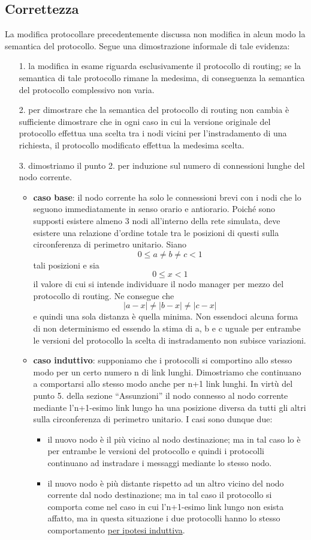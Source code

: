 \documentclass[	
	DIV=calc,
	paper=a4,
	fontsize=11pt,
	onecolumn
]{scrartcl} %
\begin{document}
	\subsection{Correttezza}
	La modifica protocollare precedentemente discussa non modifica in alcun modo la semantica del protocollo. Segue una dimostrazione informale di tale evidenza:
\begin{itemize}
	\item[1.] la modifica in esame riguarda esclusivamente il protocollo di routing; se la semantica di tale protocollo rimane la medesima, di conseguenza la semantica del protocollo complessivo non varia.
	\item[2.] per dimostrare che la semantica del protocollo di routing non cambia è sufficiente dimostrare che in ogni caso in cui la versione originale del protocollo effettua una scelta tra i nodi vicini per l'instradamento di una richiesta, il protocollo modificato effettua la medesima scelta.
	\item[3.] dimostriamo il punto 2. per induzione sul numero di connessioni lunghe del nodo corrente. 
	\begin{itemize}
	\item \textbf{caso base}: il nodo corrente ha solo le connessioni brevi con i nodi che lo seguono immediatamente in senso orario e antiorario. Poiché sono supposti esistere almeno 3 nodi all'interno della rete simulata, deve esistere una relazione d'ordine totale tra le posizioni di questi sulla circonferenza di perimetro unitario. Siano \[0 \leq a \neq b \neq c < 1\] tali posizioni e sia \[0 \leq x < 1\] il valore di cui si intende individuare il nodo manager per mezzo del protocollo di routing. Ne consegue che \[|a-x| \neq |b-x| \neq |c-x|\] e quindi una sola distanza è quella minima. Non essendoci alcuna forma di non determinismo ed essendo la stima di a, b e c uguale per entrambe le versioni del protocollo la scelta di instradamento non subisce variazioni.
	\item \textbf{caso induttivo}: supponiamo che i protocolli si comportino allo stesso modo per un certo numero n di link lunghi. Dimostriamo che continuano a comportarsi allo stesso modo anche per n+1 link lunghi. In virtù del punto 5. della sezione ``Assunzioni'' il nodo connesso al nodo corrente mediante l'n+1-esimo link lungo ha una posizione diversa da tutti gli altri sulla circonferenza di perimetro unitario. I casi sono dunque due:
		\begin{itemize}
			\item il nuovo nodo è il più vicino al nodo destinazione; ma in tal caso lo è per entrambe le versioni del protocollo e quindi i protocolli continuano ad instradare i messaggi mediante lo stesso nodo.
			\item il nuovo nodo è più distante rispetto ad un altro vicino del nodo corrente dal nodo destinazione; ma in tal caso il protocollo si comporta come nel caso in cui l'n+1-esimo link lungo non esista affatto, ma in questa situazione i due protocolli hanno lo stesso comportamento \underline{per ipotesi induttiva}.
		\end{itemize}
	\end{itemize} 
\end{itemize}
\end{document}

